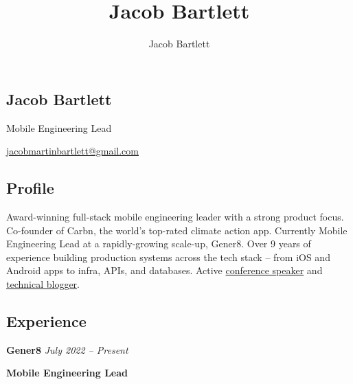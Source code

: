 \documentclass[11pt, oneside]{article}
\title{Jacob Bartlett}
\author{Jacob Bartlett}
\begin{document}
\begin{center}
\section*{Jacob Bartlett}
Mobile Engineering Lead

\href{jacobmartinbartlett@gmail.com}{jacobmartinbartlett@gmail.com}
\end{center}

\subsection*{Profile}

Award-winning full-stack mobile engineering leader with a strong product focus. Co-founder of Carbn, the world's top-rated climate action app. Currently Mobile Engineering Lead at a rapidly-growing scale-up, Gener8. Over 9 years of experience building production systems across the tech stack – from iOS and Android apps to infra, APIs, and databases. Active \href{https://nslondon.com/#jacob-bartlett-clean-networking-with-combine}{conference speaker} and \href{https://jacobbartlett.substack.com}{technical blogger}.

\medskip
\subsection*{Experience}

\textbf{Gener8}
\hfill
\textit{July 2022 – Present}

\textbf{Mobile Engineering Lead}
\end{document}
